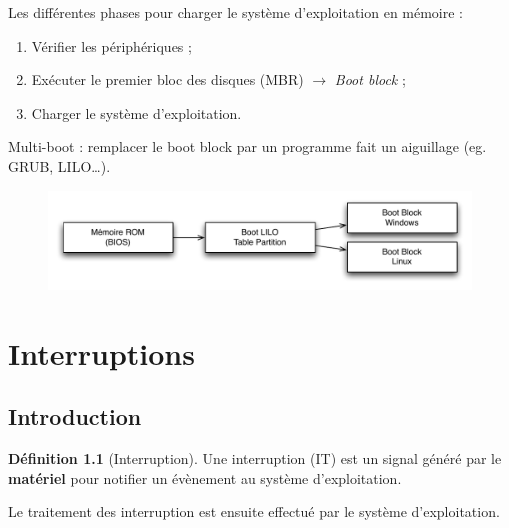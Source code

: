 \documentclass[11pt,english,french]{scrreprt}
\theoremstyle{remark}
\theoremstyle{definition}
\newtheorem*{def*}{Définition}
\begin{document}
Les différentes phases pour charger le système d'exploitation en mémoire :\begin{enumerate}
	\item Vérifier les périphériques ;
	\item Exécuter le premier bloc des disques (MBR) $\rightarrow$ \emph{Boot block} ;
	\item Charger le système d'exploitation.
\end{enumerate}

\vspace{10pt}

Multi-boot : remplacer le boot block par un programme fait un aiguillage (eg. GRUB, LILO\dots).
\begin{figure}[h!]
	\center
	\includegraphics[scale=.5]{img/multi-boot}
	\vspace{-30pt}
\end{figure}

\chapter{Interruptions} %

\section{Introduction} %
\begin{def*}[Interruption]
	Une interruption (IT) est un signal généré par le \textbf{matériel} pour notifier un évènement au système d'exploitation.
	
	Le traitement des interruption est ensuite effectué par le système d'exploitation.
\end{def*}
\end{document}
